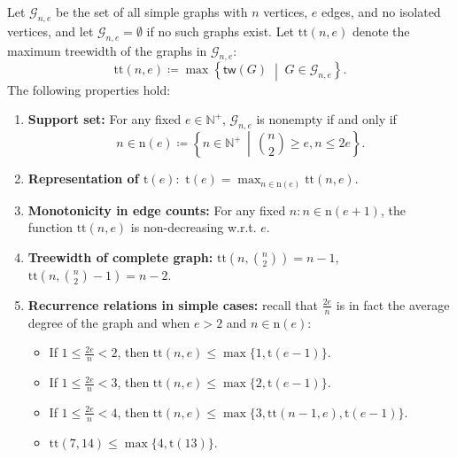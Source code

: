 \documentclass[twoside,11pt]{article}
\newcommand{\treewidthp}[1]{\mathsf{tw}(#1)}
\newcommand{\graphset}{\mathcal{G}}
\newcommand{\graphsetne}[2]{\graphset_{#1,#2}}
\newcommand{\positivenaturals}{\mathbb{N}^+}
\begin{document}
\begin{lemma}
\label{lem:property_of_tt}
Let $\graphsetne{n}{e}$ be the set of all simple graphs with $n$ vertices, $e$ edges, and no isolated vertices, and let $\graphsetne{n}{e} = \emptyset$ if no such graphs exist. Let $\mathrm{tt}(n, e)$ denote the maximum treewidth of the graphs in $\graphsetne{n}{e}$:
\begin{equation*}
\mathrm{tt}(n, e) \coloneqq \max\left\{ \treewidthp{G}\;\middle|\; G \in \graphsetne{n}{e} \right\}.
\end{equation*}
The following properties hold:
\begin{enumerate}
    \item \textbf{Support set:} For any fixed $e \in \positivenaturals $, $\graphsetne{n}{e}$ is nonempty if and only if 
    \begin{equation*}
        n \in \mathrm{n}(e) \coloneqq \left\{ n \in \positivenaturals \, \middle \vert\,  \binom{n}{2} \geq e,  n \leq 2e \right\}.
    \end{equation*}
    \item \textbf{Representation of $\mathrm{t}(e): $} $ \mathrm{t}(e) = \max_{n \in \mathrm{n}(e)} \mathrm{tt} (n, e).$
    \item \textbf{Monotonicity in edge counts:} For any fixed $n: n \in \mathrm{n}(e+1) $, the function $\mathrm{tt}(n, e)$ is non-decreasing w.r.t. $e$.
    \item \textbf{Treewidth of complete graph:} $\mathrm{tt}(n, \binom{n}{2}) =  n - 1$, $\mathrm{tt}(n, \binom{n}{2} - 1) = n - 2$.
    \item \textbf{Recurrence relations in simple cases:}  recall that $\frac{2e}{n}$ is in fact the average degree of the graph and when $e > 2$ and $n \in \mathrm{n} (e)$:
    \begin{itemize}
        \item[(1)] If $1 \leq \frac{2e}{n} < 2$, then $ \mathrm{tt}(n,e) \leq \max\{ 1, \mathrm{t}(e-1) \}$.
        \item[(2)] If $1 \leq \frac{2e}{n} < 3$, then $ \mathrm{tt}(n,e)  \leq \max\{ 2, \mathrm{t}(e-1) \} $.
        \item[(3)] If $1 \leq \frac{2e}{n} < 4$, then $ \mathrm{tt}(n,e)  \leq \max\{ 3, \mathrm{tt}(n - 1 ,e), \mathrm{t}(e-1) \}$.
        \item[(4)] $ \mathrm{tt}(7,14) \leq  \max\{ 4,  \mathrm{t}(13) \}$.
    \end{itemize}
\end{enumerate}
\end{lemma}
\end{document}
